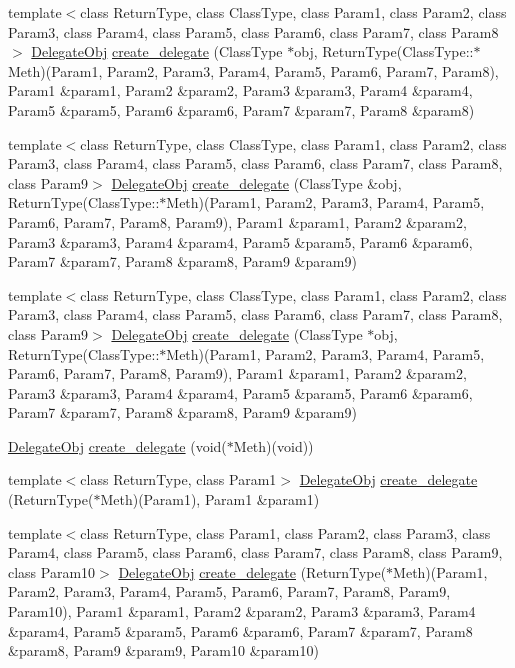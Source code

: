 \begin{CompactItemize}
\item 
template$<$class Return\-Type, class Class\-Type, class Param1, class Param2, class Param3, class Param4, class Param5, class Param6, class Param7, class Param8$>$ \hyperlink{namespaceDL_a0}{Delegate\-Obj} \hyperlink{namespaceDL_a20}{create\_\-delegate} (Class\-Type $\ast$obj, Return\-Type(Class\-Type::$\ast$Meth)(Param1, Param2, Param3, Param4, Param5, Param6, Param7, Param8), Param1 \&param1, Param2 \&param2, Param3 \&param3, Param4 \&param4, Param5 \&param5, Param6 \&param6, Param7 \&param7, Param8 \&param8)
\item 
template$<$class Return\-Type, class Class\-Type, class Param1, class Param2, class Param3, class Param4, class Param5, class Param6, class Param7, class Param8, class Param9$>$ \hyperlink{namespaceDL_a0}{Delegate\-Obj} \hyperlink{namespaceDL_a21}{create\_\-delegate} (Class\-Type \&obj, Return\-Type(Class\-Type::$\ast$Meth)(Param1, Param2, Param3, Param4, Param5, Param6, Param7, Param8, Param9), Param1 \&param1, Param2 \&param2, Param3 \&param3, Param4 \&param4, Param5 \&param5, Param6 \&param6, Param7 \&param7, Param8 \&param8, Param9 \&param9)
\item 
template$<$class Return\-Type, class Class\-Type, class Param1, class Param2, class Param3, class Param4, class Param5, class Param6, class Param7, class Param8, class Param9$>$ \hyperlink{namespaceDL_a0}{Delegate\-Obj} \hyperlink{namespaceDL_a22}{create\_\-delegate} (Class\-Type $\ast$obj, Return\-Type(Class\-Type::$\ast$Meth)(Param1, Param2, Param3, Param4, Param5, Param6, Param7, Param8, Param9), Param1 \&param1, Param2 \&param2, Param3 \&param3, Param4 \&param4, Param5 \&param5, Param6 \&param6, Param7 \&param7, Param8 \&param8, Param9 \&param9)
\item 
\hyperlink{namespaceDL_a0}{Delegate\-Obj} \hyperlink{namespaceDL_a23}{create\_\-delegate} (void($\ast$Meth)(void))
\item 
template$<$class Return\-Type, class Param1$>$ \hyperlink{namespaceDL_a0}{Delegate\-Obj} \hyperlink{namespaceDL_a24}{create\_\-delegate} (Return\-Type($\ast$Meth)(Param1), Param1 \&param1)
\item 
template$<$class Return\-Type, class Param1, class Param2, class Param3, class Param4, class Param5, class Param6, class Param7, class Param8, class Param9, class Param10$>$ \hyperlink{namespaceDL_a0}{Delegate\-Obj} \hyperlink{namespaceDL_a25}{create\_\-delegate} (Return\-Type($\ast$Meth)(Param1, Param2, Param3, Param4, Param5, Param6, Param7, Param8, Param9, Param10), Param1 \&param1, Param2 \&param2, Param3 \&param3, Param4 \&param4, Param5 \&param5, Param6 \&param6, Param7 \&param7, Param8 \&param8, Param9 \&param9, Param10 \&param10)

\end{CompactItemize}
